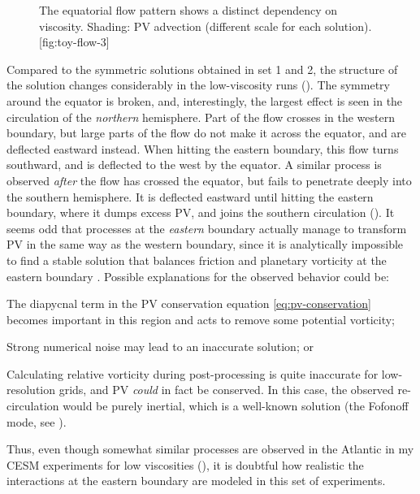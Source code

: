 \begin{figure}
	\begin{sidecaption}{The equatorial flow pattern shows a distinct dependency on viscosity. Shading: \ac{PV} advection (different scale for each solution).}[fig:toy-flow-3]
		\antimpjustification
	\end{sidecaption}
\end{figure}

Compared to the symmetric solutions obtained in set 1 and 2, the structure of the solution changes considerably in the low-viscosity runs (). The symmetry around the equator is broken, and, interestingly, the largest effect is seen in the circulation of the \emph{northern} hemisphere. Part of the flow crosses in the western boundary, but large parts of the flow do not make it across the equator, and are deflected eastward instead. When hitting the eastern boundary, this flow turns southward, and is deflected to the west by the equator. A similar process is observed \emph{after} the flow has crossed the equator, but fails to penetrate deeply into the southern hemisphere. It is deflected eastward until hitting the eastern boundary, where it dumps excess \ac{PV}, and joins the southern circulation (). It seems odd that processes at the \emph{eastern} boundary actually manage to transform \ac{PV} in the same way as the western boundary, since it is analytically impossible to find a stable solution that balances friction and planetary vorticity at the eastern boundary \citep{pedloskyoct}. Possible explanations for the observed behavior could be:
%
\begin{enum}
\item The diapycnal term in the \ac{PV} conservation equation \eqref{eq:pv-conservation} becomes important in this region and acts to remove some potential vorticity;
\item Strong numerical noise may lead to an inaccurate solution; or
\item Calculating relative vorticity during post-processing is quite inaccurate for low-resolution grids, and \ac{PV} \emph{could} in fact be conserved. In this case, the observed re-circulation would be purely inertial, which is a well-known solution (the Fofonoff mode, see ). 
\end{enum}
%
Thus, even though somewhat similar processes are observed in the Atlantic in my \ac{CESM} experiments for low viscosities (), it is doubtful how realistic the interactions at the eastern boundary are modeled in this set of experiments.


